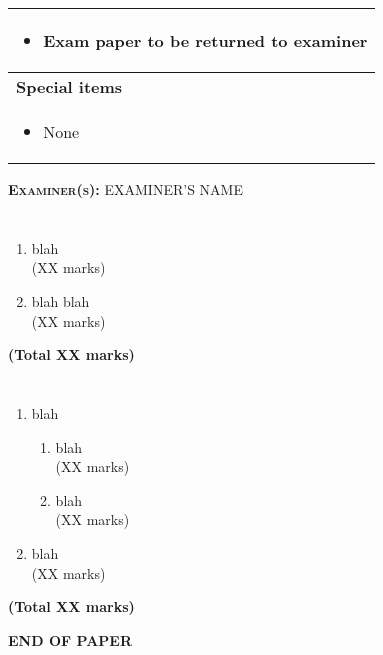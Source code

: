 \documentclass[11pt, a4paper, twosize]{article}
\begin{document}
\begin{titlepage}
\begin{table}[H]
\begin{tabular}{|p{14cm}|}
    \begin{itemize}
      \item Exam paper to be returned to examiner
    \end{itemize} \\

\hline
{\bf{Special items}}\\ 

    \begin{itemize}
      \item None
    \end{itemize} \\

\hline
\end{tabular}
\end{table}

\textsc{\Large {\bf{Examiner(s):}} EXAMINER'S NAME}

\end{titlepage}


\section{}
\begin{enumerate}
\item blah\\
\hspace*{\fill} (XX marks)
\item blah blah\\
\hspace*{\fill} (XX marks)
\end{enumerate}
\hspace*{\fill} {\bf{(Total XX marks)}}


\section{}
\begin{enumerate}
\item blah\\

    \begin{enumerate}[label=\roman*.]

    \item blah\\
    \hspace*{\fill} (XX marks)

    \item blah\\
    \hspace*{\fill} (XX marks)

    \end{enumerate}

\item blah\\
    \hspace*{\fill} (XX marks)
\end{enumerate}
\hspace*{\fill} {\bf{(Total XX marks)}}



\vspace*{2.5cm}
\centerline{{\bf{END OF PAPER}}}
\end{document}
